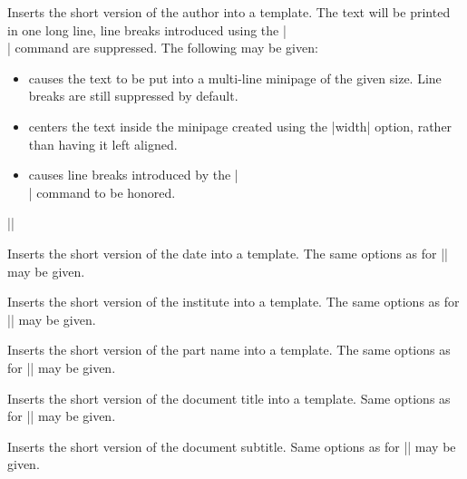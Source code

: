 \begin{command}{\insertshortauthor{}}
  Inserts the short version of the author into a template. The text
  will be printed in one long line, line breaks introduced using the
  |\\| command are suppressed.  The
  following  may be given:
  \begin{itemize}
  \item
    causes the text to be put into a multi-line minipage of the given
    size. Line breaks are still suppressed by default.
  \item
    centers the text inside the minipage created using the |width|
    option, rather than having it left aligned.
  \item
    causes line breaks introduced by the |\\| command to be honored.    
  \end{itemize}

  \example |\insertauthor[width={3cm},center,respectlinebreaks]|
\end{command}

\begin{command}{\insertshortdate{}}
  Inserts the short version of the date into a template. The same
  options as for |\insertshortauthor| may be given. 
\end{command}

\begin{command}{\insertshortinstitute{}}
  Inserts the short version of the institute into a template. The same
  options as for |\insertshortauthor| may be given. 
\end{command}

\begin{command}{\insertshortpart{}}
  Inserts the short version of the part name into a template. The same
  options as for |\insertshortauthor| may be given. 
\end{command}

\begin{command}{\insertshorttitle{}}
  Inserts the short version of the document title into a template. Same
  options as for |\insertshortauthor| may be given. 
\end{command}

\begin{command}{\insertshortsubtitle{}}
  Inserts the short version of the document subtitle. Same
  options as for |\insertshortauthor| may be given. 
\end{command}

